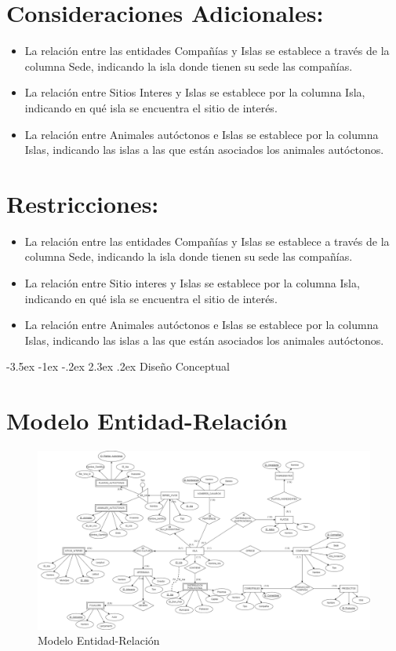 \documentclass[11pt]{report}
\makeatletter
\renewcommand\chapter{\@startsection{chapter}{0}{\z@}%
    {-3.5ex \@plus -1ex \@minus -.2ex}%
    {2.3ex \@plus.2ex}%
    {\normalfont\Large\bfseries}}
\makeatother
\begin{document}
\section{Consideraciones Adicionales:}

\begin{itemize}
      \item La relación entre las entidades Compañías y Islas se establece a través de la columna Sede, indicando la isla donde tienen su sede las compañías.
      \item La relación entre Sitios Interes y Islas se establece por la columna Isla, indicando en qué isla se encuentra el sitio de interés.
      \item La relación entre Animales autóctonos e Islas se establece por la columna Islas, indicando las islas a las que están asociados los animales autóctonos.
\end{itemize}

\section{Restricciones:}

\begin{itemize}
      \item La relación entre las entidades Compañías y Islas se establece a través de la columna Sede, indicando la isla donde tienen su sede las compañías.
      \item La relación entre Sitio interes y Islas se establece por la columna Isla, indicando en qué isla se encuentra el sitio de interés.
      \item La relación entre Animales autóctonos e Islas se establece por la columna Islas, indicando las islas a las que están asociados los animales autóctonos.
\end{itemize}
\chapter{Diseño Conceptual}

\section{Modelo Entidad-Relación}
\begin{figure}[H]
      \centering
      \includegraphics[width=1\textwidth]{../diagrams/ER-PF-ADBD.png}
      \caption{Modelo Entidad-Relación}
      \label{fig:modelo_er}
\end{figure}
\end{document}
